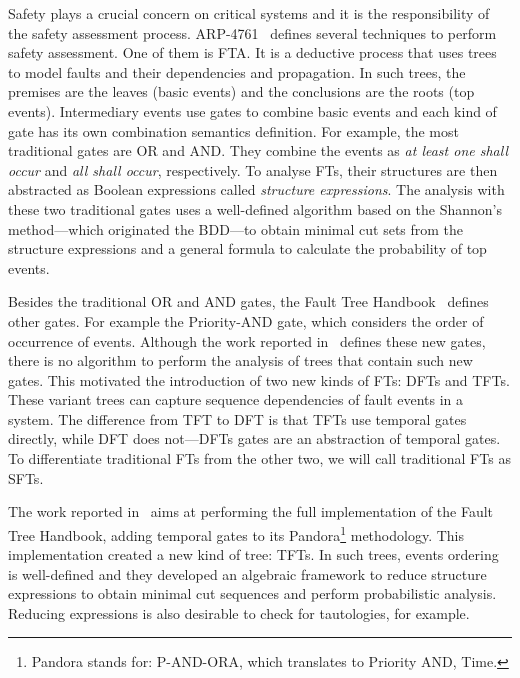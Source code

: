 \documentclass[en,twoside,onehalfspacing,phd]{risethesis}
\def\FThandbook{Fault Tree Handbook~\cite{VGR+1981}\index{Fault Tree!Handbook}%
  \gdef\FThandbook{Fault Tree Handbook\index{Fault Tree!Handbook}\xspace}%
  \xspace}
\def\pandora{Pandora\footnote{Pandora stands for: P-AND-ORA, which translates to Priority AND, Time.}%
  \gdef\pandora{Pandora\xspace}%
  \xspace}
\begin{document}
Safety plays a crucial concern on critical systems and it is the responsibility of the safety assessment process.
ARP-4761~\cite{SAE1996b} defines several techniques to perform safety assessment.
One of them is \ac{FTA}.
It is a deductive process that uses trees to model faults and their dependencies and propagation.
In such trees, the premises are the leaves (basic events) and the conclusions are the roots (top events).
Intermediary events use gates to combine basic events and each kind of gate has its own combination semantics definition.
For example, the most traditional gates are OR and AND.
They combine the events as \emph{at least one shall occur} and \emph{all shall occur}, respectively.
To analyse \aclp{FT}, their structures are then abstracted as Boolean expressions called \emph{structure expressions}.
The analysis with these two traditional gates uses a well-defined algorithm based on the Shannon's method---which originated the \ac{BDD}---to obtain minimal cut sets from the structure expressions and a general formula to calculate the probability of top events.

Besides the traditional OR and AND gates, the \FThandbook defines other gates.
For example the Priority-AND gate, which considers the order of occurrence of events.
Although the work reported in~\cite{VGR+1981} defines these new gates, there is no algorithm to perform the analysis of trees that contain such new gates.
This motivated the introduction of two new kinds of \aclp{FT}: \acp{DFT} and \acp{TFT}.
These variant trees can capture sequence dependencies of fault events in a system.
The difference from \ac{TFT} to \ac{DFT} is that \acp{TFT} use temporal gates directly, while \ac{DFT} does not---\acp{DFT} gates are an abstraction of temporal gates.
To differentiate traditional \aclp{FT} from the other two, we will call traditional \aclp{FT} as \acp{SFT}.

The work reported in~\cite{WP2009} aims at performing the full implementation of the \FThandbook, adding temporal gates to its \pandora methodology.
This implementation created a new kind of tree: \acp{TFT}.
In such trees, events ordering is well-defined and they developed an algebraic framework to reduce structure expressions to obtain minimal cut sequences and perform probabilistic analysis.
Reducing expressions is also desirable to check for tautologies, for example.
\end{document}
